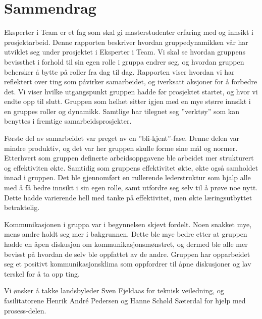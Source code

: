 \chapter*{Sammendrag}
Eksperter i Team er et fag som skal gi masterstudenter erfaring med og innsikt i prosjektarbeid.
Denne rapporten beskriver hvordan gruppedynamikken vår har utviklet seg under prosjektet i Eksperter i Team.
Vi skal se hvordan gruppens bevissthet i forhold til sin egen rolle i gruppa endrer seg, og hvordan gruppen behersker å bytte på roller fra dag til dag.
Rapporten viser hvordan vi har reflektert over ting som påvirker samarbeidet, og iverksatt aksjoner for å forbedre det. 
Vi viser hvilke utgangspunkt gruppen hadde før prosjektet startet, og hvor vi endte opp til slutt. 
Gruppen som helhet sitter igjen med en mye større innsikt i en gruppes roller og dynamikk. 
Samtlige har tilegnet seg ''verktøy'' som kan benyttes i fremtige samarbeidsprosjekter. 
\vspace{\secspace}

Første del av samarbeidet var preget av en ''bli-kjent''-fase. 
Denne delen var mindre produktiv, og det var her gruppen skulle forme sine mål og normer. 
Etterhvert som gruppen definerte arbeidsoppgavene ble arbeidet mer strukturert og effektiviten økte. 
Samtidig som gruppens effektivitet økte, økte også samholdet innad i gruppen. 
Det ble gjennomført en rullerende lederstruktur som hjalp alle med å få bedre innsikt i sin egen rolle, samt utfordre seg selv til å prøve noe nytt. 
Dette hadde varierende hell med tanke på effektivitet, men økte læringsutbyttet betraktelig. 
\vspace{\secspace}

Kommunikasjonen i gruppa var i begynnelsen skjevt fordelt. 
Noen snakket mye, mens andre holdt seg mer i bakgrunnen. 
Dette ble mye bedre etter at gruppen hadde en åpen diskusjon om kommunikasjonsmønstret, og dermed ble alle mer bevisst på hvordan de selv ble oppfattet av de andre. 
Gruppen har opparbeidet seg et positivt kommunikasjonsklima som oppfordrer til åpne diskusjoner og lav terskel for å ta opp ting. 

\vfill
\begin{center}
Vi ønsker å takke landsbyleder Sven Fjeldaas for teknisk veiledning, og fasilitatorene Henrik André Pedersen og Hanne Schøld Sæterdal for hjelp med prosess-delen.
\end{center}
